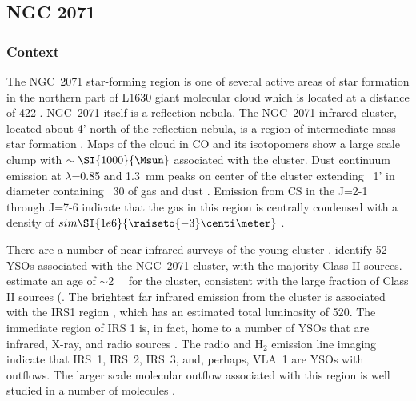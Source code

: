 
\subsection{NGC 2071}

\subsubsection{Context}
The NGC~2071 star-forming region is one of several active areas of star formation in the northern part of L1630 giant molecular cloud which is located at a distance of \SI{422}{\pc} \citep{vanDishoeck:2011em}. NGC~2071 itself is a reflection nebula.
The NGC~2071 infrared cluster, located about 4' north of the reflection nebula, is a region of intermediate mass star formation \citep{Strom1976, Persson1981, Butner1990}. Maps of the cloud in CO and its isotopomers \citep{Buckle2010} show a large scale clump with $\sim\SI{1000}{\Msun}$ associated with the cluster. Dust continuum emission at $\lambda$=0.85 and \SI{1.3}{\milli\meter} peaks on center of the cluster extending ~1' in diameter containing ~\SI{30}{\Msun} of gas and dust \citep{Johnstone2001,Mitchell2001,Launhardt1996}. Emission from CS in the J=2-1 through J=7-6 indicate that the gas in this region is centrally condensed with a density of $sim\SI{1e6}{\raiseto{-3}\centi\meter}$ \citep{Zhou1990}. 

There are a number of near infrared surveys of the young cluster \citep[e.g.,][]{Strom1976,Lada1991,Megeath2012,Spezzi2015}. \cite{Spezzi2015} identify 52 YSOs associated with the NGC~2071 cluster, with the majority Class II sources. \cite{Flaherty2008} estimate an age of $\sim$\SI{2}{\mega\year} for the cluster, consistent with the large fraction of Class II sources (\cite{Evans2009}. The brightest far infrared emission from the cluster is associated with the IRS1 region \citep{Harvey1979,Butner1990}, which has an estimated total luminosity of \SI{520}{\Lsun}. The immediate region of IRS 1 is, in fact, home to a number of YSOs that are infrared, X-ray, and radio sources \citep{Skinner2009,C-G2012,Kempen2012}. The radio \citep{C-G2012} and H$_2$ emission line imaging indicate that IRS~1, IRS~2, IRS~3, and, perhaps, VLA~1 are YSOs with outflows. The larger scale molecular outflow associated with this region is well studied in a number of molecules \citep{Bally1982,Chernin1993,Stoji2008}.

